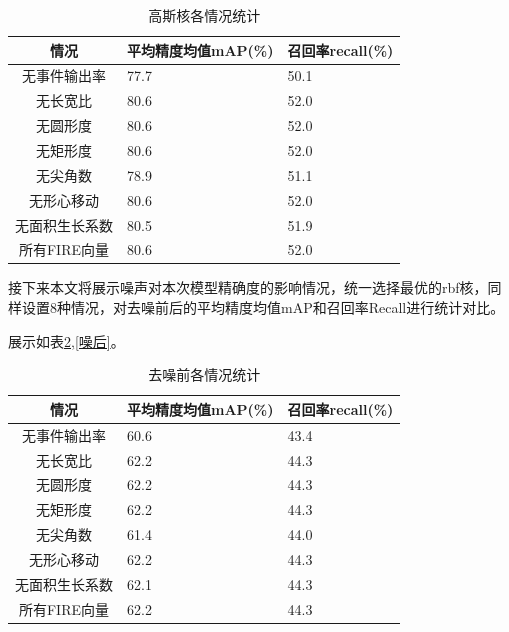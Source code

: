 \begin{table}[ht]
    \centering
    \caption{高斯核各情况统计}
    \begin{tabularx}{0.7\textwidth}{c|X|X}
        \toprule
        情况&平均精度均值mAP(\%)&召回率recall(\%)\\
        \midrule
        无事件输出率&77.7&50.1\\
        无长宽比&80.6&52.0\\
        无圆形度&80.6&52.0\\
        无矩形度&80.6&52.0\\
        无尖角数&78.9&51.1\\
        无形心移动&80.6&52.0\\
        无面积生长系数&80.5&51.9\\
        所有FIRE向量&80.6&52.0\\
        \bottomrule
    \end{tabularx}
    \label{rbf}
\end{table}



接下来本文将展示噪声对本次模型精确度的影响情况，统一选择最优的rbf核，同样设置8种情况，对去噪前后的平均精度均值mAP和召回率Recall进行统计对比。

展示如表\ref{噪前},\ref{噪后}。
\begin{table}[ht]
    \centering
    \caption{去噪前各情况统计}
    \begin{tabularx}{0.7\textwidth}{c|X|X}
        \toprule
        情况&平均精度均值mAP(\%)&召回率recall(\%)\\
        \midrule
        无事件输出率&60.6&43.4\\
        无长宽比&62.2&44.3\\
        无圆形度&62.2&44.3\\
        无矩形度&62.2&44.3\\
        无尖角数&61.4&44.0\\
        无形心移动&62.2&44.3\\
        无面积生长系数&62.1&44.3\\
        所有FIRE向量&62.2&44.3\\
        \bottomrule
    \end{tabularx}
    \label{噪前}
\end{table}


